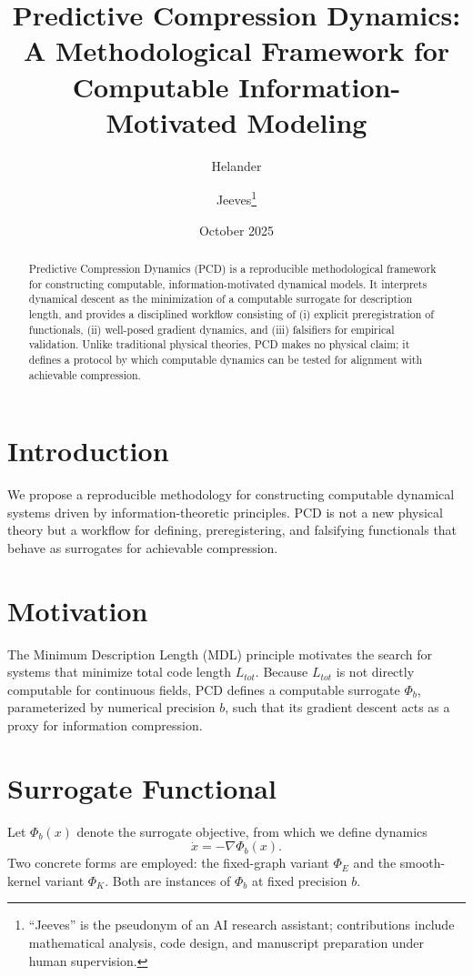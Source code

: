 \documentclass[11pt]{article}
\title{\textbf{Predictive Compression Dynamics: A Methodological Framework for Computable Information-Motivated Modeling}}
\author[1]{Helander}
\author[2]{Jeeves\thanks{``Jeeves'' is the pseudonym of an AI research assistant; contributions include mathematical analysis, code design, and manuscript preparation under human supervision.}}
\affil[1]{Independent Researcher}
\affil[2]{Computational Systems Advisor}
\date{October 2025}
\begin{document}
\maketitle

\begin{abstract}
Predictive Compression Dynamics (PCD) is a reproducible methodological framework for constructing computable, information-motivated dynamical models. 
It interprets dynamical descent as the minimization of a computable surrogate for description length, and provides a disciplined workflow consisting of (i) explicit preregistration of functionals, (ii) well-posed gradient dynamics, and (iii) falsifiers for empirical validation.
Unlike traditional physical theories, PCD makes no physical claim; it defines a protocol by which computable dynamics can be tested for alignment with achievable compression.
\end{abstract}

\section{Introduction}
We propose a reproducible methodology for constructing computable dynamical systems driven by information-theoretic principles. 
PCD is not a new physical theory but a workflow for defining, preregistering, and falsifying functionals that behave as surrogates for achievable compression.

\section{Motivation}
The Minimum Description Length (MDL) principle motivates the search for systems that minimize total code length \(L_{tot}\).
Because \(L_{tot}\) is not directly computable for continuous fields, PCD defines a computable surrogate \(\Phi_b\), parameterized by numerical precision \(b\), such that its gradient descent acts as a proxy for information compression.

\section{Surrogate Functional}
Let \(\Phi_b(x)\) denote the surrogate objective, from which we define dynamics
\begin{equation}
  \dot{x} = -\nabla \Phi_b(x).
\end{equation}
Two concrete forms are employed: the fixed-graph variant \(\Phi_E\) and the smooth-kernel variant \(\Phi_K\). 
Both are instances of \(\Phi_b\) at fixed precision \(b\).
\end{document}
